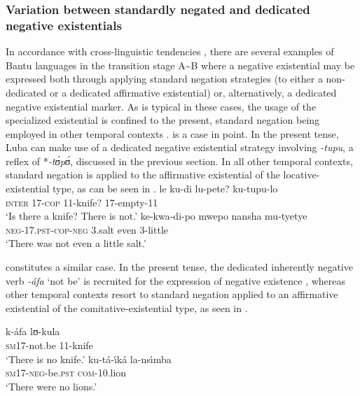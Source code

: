 \documentclass[output=paper,draft,draftmode,colorlinks,citecolor=brown]{langscibook}
\begin{document}
\subsubsection{Variation between standardly negated and dedicated negative
existentials}\label{sec:1:5.2.2} In accordance with cross-linguistic
tendencies \citep{Veselinova2016}, there are several examples of Bantu
languages in the transition stage A{\textasciitilde}B where a negative
existential may be expressed both through applying standard negation
strategies (to either a non-dedicated or a dedicated affirmative
existential) or, alternatively, a dedicated negative existential marker. As
is typical in these cases, the usage of the specialized existential is
confined to the present, standard negation being employed in other temporal
contexts \parencites{Veselinova2013}{Veselinova2016}.  is a case in
point. In the present tense, Luba can make use of a dedicated negative
existential strategy involving \textit{-tupu}, a reflex of
*\textit{-t{\'ʊ}p{\'ʊ}}, discussed in the previous section. In all other
temporal contexts, standard negation is applied to the affirmative
existential of the locative-existential type, as can be seen in
.  \ea\label{ex:luba-knife-salt}
 \ea\gll le ku-di
lu-pete? ku-tupu-lo\\ \textsc{inter} 17-\textsc{cop} 11-knife? 17-empty-11\\
\glt 	`Is there a knife? There is not.'
\ex\gll ke-kwa-di-po mwepo nansha
mu-tyetye\\ \textsc{neg-17.pst-cop-neg} 3.salt even 3-little\\
\glt
`There was not even a little salt.'
\z
\z

 constitutes a similar
case. In the present tense, the dedicated inherently negative verb
\textit{-áfa} `not be' is recruited for the expression of negative
existence , whereas other temporal contexts resort to
standard negation applied to an affirmative existential of the
comitative-existential type, as seen in .

\ea\label{ex:ombo-knife-lion}  \ea\label{ex:ombo-knife}
\gll k-áfa
lʊ-kula\\ \textsc{sm}17-not.be 11-knife\\
\glt 	`There is no knife.'
\ex\label{ex:ombo-lion}
\gll ku-tá-{\'\i}ká la-ns{\'\i}mba\\
\textsc{sm}17-\textsc{neg}-be.\textsc{pst} \textsc{com}-10.lion\\
\glt
`There were no lions.'
\z
\z
\end{document}
